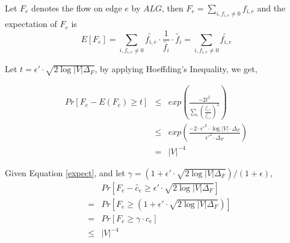 \documentclass[onecolumn,11pt,journal, compsoc]{IEEEtran}
\begin{document}
Let $F_e$ denotes the flow on edge $e$ by $ALG$, then $F_e = \sum_{i, f_{i,e} \neq 0}{f_{i,e}}$ and the expectation of $F_e$ is 
\begin{equation} \label{expect}
E[F_e] = \sum_{i, f_{i,e} \neq 0}\tilde{f_{i,e}} \cdot \frac{1}{\tilde{f_i}} \cdot  \tilde{f_i} = \sum_{i, f_{i,e} \neq 0}\tilde{f_{i,e}}
\end{equation}



Let $t=\epsilon' \cdot \sqrt{2\log|V|\Delta_F}$, by applying Hoeffding's Inequality, we get,
	
\begin{eqnarray}
Pr[F_e - E(F_e) \ge t] &\le& exp(\frac{-2t^2}{\sum_{i}(\frac{\tilde{f_{i,e}}}{\tilde{f_{i,e}}})^2}) \\
&\le& exp(\frac{-2 \cdot \epsilon'^2 \cdot \log|V| \cdot \Delta_F}{\epsilon'^2 \cdot\Delta_F}) \\
&=& |V|^{-4}
\end{eqnarray}


Given Equation \ref{expect}, and let $\gamma = (1+\epsilon' \cdot \sqrt{2\log|V|\Delta_F})/ (1+\epsilon)$,
\begin{eqnarray}
	&&Pr[F_e - \tilde{c_e} \ge \epsilon' \cdot \sqrt{2\log|V|\Delta_F}] \\
	&=& Pr[F_e \ge (1+\epsilon' \cdot \sqrt{2\log|V|\Delta_F})] \\
	&=& Pr[F_e \ge \gamma \cdot c_e] \\
	&\le& |V|^{-4}
\end{eqnarray}

%
\end{document}
